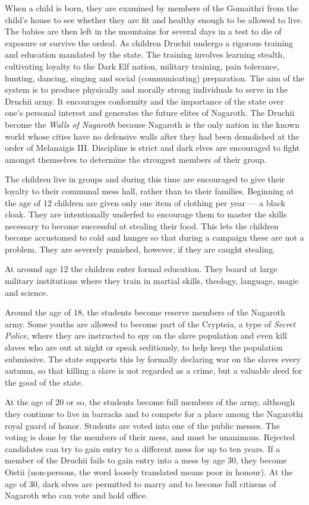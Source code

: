 \documentclass[a4paper]{dnd5}
\begin{document}
When a child is born, they are examined by members of the Gomaithri from the child's house to see whether they are fit and healthy enough to be allowed to live. The babies are then left in the mountains for several days in a test to die of exposure or survive the ordeal.  As children Druchii undergo a rigorous training and education mandated by the state.  The training involves learning stealth, cultivating loyalty to the Dark Elf nation, military training, pain tolerance, hunting, dancing, singing and social (communicating) preparation.  
The aim of the system is to produce physically and morally strong individuals to serve in the Druchii army. It encourages conformity and the importance of the state over one's personal interest and generates the future elites of Nagaroth.  The Druchii become the \emph{Walls of Nagaroth} because Nagaroth is the only nation in the known world whose cities have no defensive walls after they had been demolished at the order of Melanaigis III.  Discipline is strict and dark elves are encouraged to fight amongst themselves to determine the strongest members of their group.

The children live in groups and during this time are encouraged to give their loyalty to their communal mess hall, rather than to their families. Beginning at the age of 12 children are given only one item of clothing per year — a black cloak.  They are intentionally underfed to encourage them to master the skills necessary to become successful at stealing their food. This lets the children become accustomed to cold and hunger so that during a campaign these are not a problem. They are severely punished, however, if they are caught stealing. 

At around age 12 the children enter formal education.  They board at large military institutions where they train in martial skills, theology, language, magic and science.

 Around the age of 18, the students become reserve members of the Nagaroth army. Some youths are allowed to become part of the Crypteia, a type of \emph{Secret Police}, where they are instructed to spy on the slave population and even kill slaves who are out at night or speak seditiously, to help keep the population submissive.  The state supports this by formally declaring war on the slaves every autumn, so that killing a slave is not regarded as a crime, but a valuable deed for the good of the state.

At the age of 20 or so, the students become full members of the army, although they continue to live in barracks and to compete for a place among the Nagarothi royal guard of honor.  Students are voted into one of the public messes. The voting is done by the members of their mess, and must be unanimous. Rejected candidates can try to gain entry to a different mess for up to ten years. If a member of the Druchii fails to gain entry into a mess by age 30, they become Oistii (non-persons, the word loosely translated means poor in honour). At the age of 30, dark elves are permitted to marry and to become full citizens of Nagaroth who can vote and hold office.  
\end{document}
